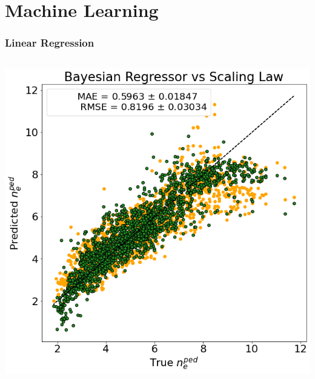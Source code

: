 \documentclass{beamer}
\begin{document}
\section{Machine Learning}
\begin{frame}
	\frametitle{Linear Regression}
\begin{block}{}
\begin{columns}

\includegraphics[scale=0.25]{../src/Baysian_regression_predictions}


\end{columns}
\end{block}
\end{frame}
\end{document}
